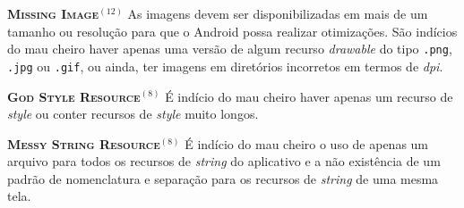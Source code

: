 
  \noindent
  \textbf{\textsc{{\small Missing Image}}}$^{(12)}$
      As imagens devem ser disponibilizadas em mais de um tamanho ou resolução para que o Android possa realizar otimizações. São indícios do mau cheiro haver apenas uma versão de algum recurso \textit{drawable} do tipo \texttt{.png}, \texttt{.jpg} ou \texttt{.gif}, ou ainda, ter imagens em diretórios incorretos em termos de \textit{dpi}.


  \noindent
  \textbf{\textsc{{\small God Style Resource}}}$^{(8)}$
      É indício do mau cheiro haver apenas um recurso de \textit{style} ou conter recursos de \textit{style} muito longos.


  \noindent
  \textbf{\textsc{{\small Messy String Resource}}}$^{(8)}$
      É indício do mau cheiro o uso de apenas um arquivo para todos os recursos de \textit{string} do aplicativo e a não existência de um padrão de nomenclatura e separação para os recursos de \textit{string} de uma mesma tela.

